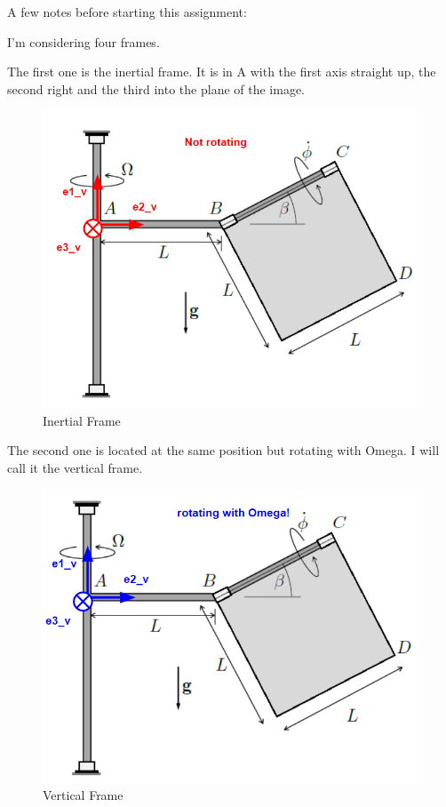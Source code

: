 A few notes before starting this assignment:

I'm considering four frames. 

The first one is the inertial frame. It is in A with the first axis straight up, the second right and the third into the plane of the image.

\begin{figure}[ht]
    \centering
    \includegraphics[scale=0.5]{images/inertial_frame.png}
    \caption{Inertial Frame}
    \label{fig:inertial_frame}
\end{figure}

\noindent The second one is located at the same position but rotating with Omega. I will call it the vertical frame.

\begin{figure}[ht]
    \centering
    \includegraphics[scale=0.5]{images/vertical_frame.png}
    \caption{Vertical Frame}
    \label{fig:vertical_frame}
\end{figure}
\clearpage %

